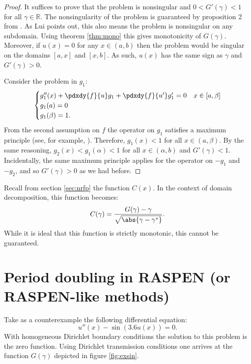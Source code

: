 \documentclass{article}
\begin{document}
\begin{proof}
It suffices to prove that the problem is nonsingular and $0 < G'(\gamma) < 1$ for all $\gamma \in \mathbb{R}$.
The nonsingularity of the problem is guaranteed by proposition 2 from \cite{lui1999schwarz}.
As Lui points out, this also means the problem is nonsingular on any subdomain.
Using theorem \ref{thm:mono} this gives monotonicity of $G(\gamma)$.
Moreover, if $u(x)=0$ for any $x \in (a,b)$ then the problem would be singular on the domains $[a,x]$ and $[x,b]$.
As such, $u(x)$ has the same sign as $\gamma$ and $G'(\gamma) > 0$.

Consider the problem in $g_1$:
\begin{equation*}
\begin{cases} g_1''(x) + \pdxdy{f}{u} g_1 + \pdxdy{f}{u'} g_1' = 0 & x \in [a,\beta] \\ g_1(a) = 0 \\ g_1(\beta) = 1 . \end{cases}
\end{equation*}
From the second assumption on $f$ the operator on $g_1$ satisfies a maximum principle (see, for example, \cite{lui1999schwarz}).
Therefore, $g_1(x) < 1$ for all $x \in (a,\beta)$.
By the same reasoning, $g_2(x) < g_1(\alpha) < 1$ for all $x \in (\alpha, b)$ and $G'(\gamma) < 1$.
Incidentally, the same maximum principle applies for the operator on $-g_1$ and $-g_2$, and so $G'(\gamma) > 0$ as we had before.
\end{proof}

Recall from section \ref{sec:nrfp} the function $C(x)$.
In the context of domain decomposition, this function becomes:
\begin{equation*}
C(\gamma) = \frac{ G(\gamma) - \gamma}{\sqrt{\abs{\gamma - \gamma^*}}} .
\end{equation*}
While it is ideal that this function is strictly monotonic, this cannot be guaranteed.

\section{Period doubling in RASPEN (or RASPEN-like methods)}
\label{sec:period}

Take as a counterexample the following differential equation:
\begin{equation*}
u''(x) - \sin(3.6 u(x)) = 0 .
\end{equation*}
With homogeneous Dirichlet boundary conditions the solution to this problem is the zero function.
Using Dirichlet transmission conditions one arrives at the function $G(\gamma)$ depicted in figure \ref{fig:exsin}.
\end{document}
